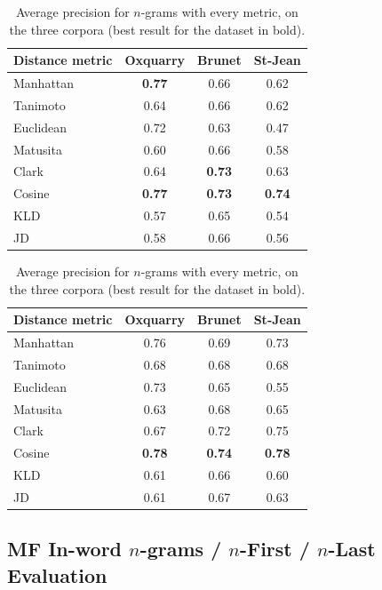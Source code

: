 \begin{table}
  \centering
  \caption{Average precision for $n$-grams with every metric, on the three corpora (best result for the dataset in bold).}
  \label{tab:letter_ngrams}

  \begin{tabular}{l c c c}
    \toprule
    Distance metric & Oxquarry & Brunet & St-Jean \\
    \midrule
    Manhattan & \textbf{0.77} & 0.66 & 0.62 \\
    Tanimoto & 0.64 & 0.66 & 0.62 \\
    Euclidean & 0.72 & 0.63 & 0.47 \\
    Matusita & 0.60 & 0.66 & 0.58 \\
    Clark & 0.64 & \textbf{0.73} & 0.63 \\
    Cosine & \textbf{0.77} & \textbf{0.73} & \textbf{0.74} \\
    KLD & 0.57 & 0.65 & 0.54 \\
    JD & 0.58 & 0.66 & 0.56 \\
    \bottomrule
  \end{tabular}

  \vspace{0.5cm}

  \begin{tabular}{l c c c}
    \toprule
    Distance metric & Oxquarry & Brunet & St-Jean \\
    \midrule
    Manhattan & 0.76 & 0.69 & 0.73 \\
    Tanimoto & 0.68 & 0.68 & 0.68 \\
    Euclidean & 0.73 & 0.65 & 0.55 \\
    Matusita & 0.63 & 0.68 & 0.65 \\
    Clark & 0.67 & 0.72 & 0.75 \\
    Cosine & \textbf{0.78} & \textbf{0.74} & \textbf{0.78} \\
    KLD & 0.61 & 0.66 & 0.60 \\
    JD & 0.61 & 0.67 & 0.63 \\
    \bottomrule
  \end{tabular}
\end{table}

\subsection{MF In-word $n$-grams / $n$-First / $n$-Last Evaluation}

